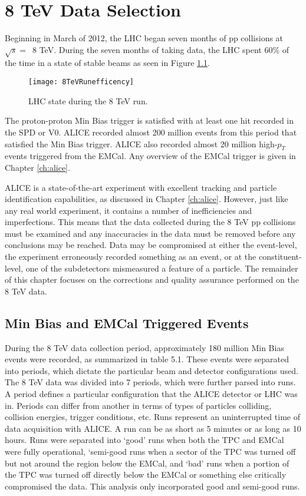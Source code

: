 \chapter{8 TeV Data Selection} \label{ch:data}

Beginning in March of 2012, the LHC began seven months of pp collisions at $\sqrt{s} = \,$ 8 TeV. During the seven months of taking data, the LHC spent 60\% of the time in a state of stable beams as seen in Figure \ref{fig:RunEffer}.

\begin{figure}[h]
\texttt{[image: 8TeVRunefficency]}
\centering
\caption{LHC state during the 8 TeV run. }
\label{fig:RunEffer}
\end{figure}


The proton-proton Min Bias trigger is satisfied with at least one hit recorded in the SPD or V0.  ALICE recorded almost 200 million events from this period that satisfied the Min Bias trigger.  ALICE also recorded almost 20 million high-$p_{T}$ events triggered from the EMCal.  Any overview of the EMCal trigger is given in Chapter \ref{ch:alice}.

ALICE is a state-of-the-art experiment with excellent tracking and particle identification capabilities, as discussed in Chapter \ref{ch:alice}.  However, just like any real world experiment, it contains a number of inefficiencies and imperfections.  This means that the data collected during the 8 TeV pp collisions must be examined and any inaccuracies in the data must be removed before any conclusions may be reached.  Data may be compromised at either the event-level, the experiment erroneously recorded something as an event, or at the constituent-level, one of the subdetectors mismeasured a feature of a particle.  The remainder of this chapter focuses on the corrections and quality assurance performed on the 8 TeV data.



\section{Min Bias and EMCal Triggered Events}

During the 8 TeV data collection period, approximately 180 million Min Bias events were recorded, as summarized in table 5.1.  These events were separated into periods, which dictate the particular beam and detector configurations used.  The 8 TeV data was divided into 7 periods, which were further parsed into runs.  A period defines a particular configuration that the ALICE detector or LHC was in.  Periods can differ from another in terms of types of particles colliding, collision energies, trigger conditions, etc. Runs represent an uninterrupted time of data acquisition with ALICE. A run can be as short as 5 minutes or as long as 10 hours.  Runs were separated into `good' runs when both the TPC and EMCal were fully operational, `semi-good runs when a sector of the TPC was turned off but not around the region below the EMCal, and `bad' runs when a portion of the TPC was turned off directly below the EMCal or something else critically compromised the data.  This analysis only incorporated good and semi-good runs.

